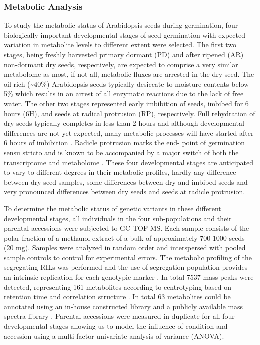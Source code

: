 \subsubsection{Metabolic Analysis}
To study the metabolic status of Arabidopsis seeds during germination, four biologically important developmental stages 
of seed germination with expected variation in metabolite levels to different extent were selected. The first two stages, 
being freshly harvested primary dormant (PD) and after ripened (AR) non-dormant dry seeds, respectively, are expected to 
comprise a very similar metabolome as most, if not all, metabolic fluxes are arrested in the dry seed. The oil rich 
(\textasciitilde40\%) Arabidopsis seeds \cite{Hobbs:2004} typically desiccate to moisture contents below 5\% which results in an 
arrest of all enzymatic reactions due to the lack of free water. The other two stages represented early imbibition of 
seeds, imbibed for 6 hours (6H), and seeds at radical protrusion (RP), respectively. Full rehydration of dry seeds typically 
completes in less than 2 hours and although developmental differences are not yet expected, many metabolic processes will 
have started after 6 hours of imbibition \cite{Nakabayashi:2005, Howell:2009}. Radicle protrusion marks the end-
point of germination sensu stricto and is known to be accompanied by a major switch of both the transcriptome and metabolome 
\cite{Nakabayashi:2005, Fait:2006}. These four developmental stages are anticipated to vary to different degrees 
in their metabolic profiles, hardly any difference between dry seed samples, some differences between dry and imbibed seeds 
and very pronounced differences between dry seeds and seeds at radicle protrusion.

To determine the metabolic status of genetic variants in these different developmental stages, all individuals in the 
four sub-populations and their parental accessions were subjected to GC-TOF-MS. Each sample consists of the polar fraction 
of a methanol extract of a bulk of approximately 700-1000 seeds (20 mg). Samples were analyzed in random order and 
interspersed with pooled sample controls to control for experimental errors. The metabolic profiling of the segregating RILs 
was performed and the use of segregation population provides an intrinsic replication for each genotypic marker \cite{Jansen:2001a}.
In total 7537 mass peaks were detected, representing 161 metabolites according to centrotyping based on retention time and 
correlation structure \cite{Tikunov:2012}. In total 63 metabolites could be annotated using an in-house constructed library 
and a publicly available mass spectra library \cite{Schauer:2005}. Parental accessions were measured in duplicate for all 
four developmental stages allowing us to model the influence of condition and accession using a multi-factor univariate 
analysis of variance (ANOVA). 


